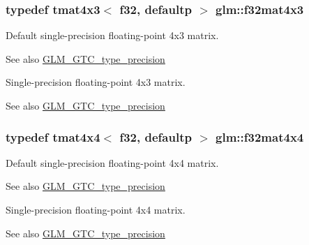 \subsubsection[{f32mat4x3}]{\setlength{\rightskip}{0pt plus 5cm}typedef tmat4x3$<$ f32, defaultp $>$ {\bf glm\+::f32mat4x3}}\label{group__gtc__type__precision_gad68d998fa74028e02bfadd4778bd549a}
Default single-\/precision floating-\/point 4x3 matrix. \begin{DoxySeeAlso}{See also}
\hyperlink{group__gtc__type__precision}{G\+L\+M\+\_\+\+G\+T\+C\+\_\+type\+\_\+precision}
\end{DoxySeeAlso}
Single-\/precision floating-\/point 4x3 matrix. \begin{DoxySeeAlso}{See also}
\hyperlink{group__gtc__type__precision}{G\+L\+M\+\_\+\+G\+T\+C\+\_\+type\+\_\+precision} 
\end{DoxySeeAlso}
\hypertarget{group__gtc__type__precision_gac4a4b2671cbf50ab95c55fce2bfcd811}{}
\subsubsection[{f32mat4x4}]{\setlength{\rightskip}{0pt plus 5cm}typedef tmat4x4$<$ f32, defaultp $>$ {\bf glm\+::f32mat4x4}}\label{group__gtc__type__precision_gac4a4b2671cbf50ab95c55fce2bfcd811}
Default single-\/precision floating-\/point 4x4 matrix. \begin{DoxySeeAlso}{See also}
\hyperlink{group__gtc__type__precision}{G\+L\+M\+\_\+\+G\+T\+C\+\_\+type\+\_\+precision}
\end{DoxySeeAlso}
Single-\/precision floating-\/point 4x4 matrix. \begin{DoxySeeAlso}{See also}
\hyperlink{group__gtc__type__precision}{G\+L\+M\+\_\+\+G\+T\+C\+\_\+type\+\_\+precision} 
\end{DoxySeeAlso}
\hypertarget{group__gtc__type__precision_gac59c4d798396552e4bbb866b3d8a2f18}{}
